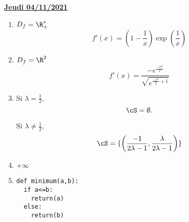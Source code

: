 \documentclass[a4paper, 11pt,reqno]{article}
\newcommand{\jour}[1]{
\begin{center}
\underline{\textbf{#1}}
\end{center}

 }
\begin{document}
\jour{Jeudi 04/11/2021}
\begin{correction}
\begin{enumerate}
\item $D_f = \R_+^*$
$$f'(x) =\left( 1 -\frac{1}{x}\right)\exp\left(\frac{1}{x}\right)$$
\item $D_f=\R^2$
$$f'(x) =\frac{-e^{\frac{-x^2}{2}}}{\sqrt{e^{\frac{-x^2}{2}+1}}}$$
\item 
Si $\lambda=\frac{1}{2}$, $$\cS = \emptyset.$$

Si $\lambda\neq \frac{1}{2},$
$$\cS =\{\left( \frac{-1}{2\lambda -1},\frac{\lambda}{2\lambda -1}   \right) \}$$



\item $+\infty$
\item 
\begin{lstlisting}
def minimum(a,b):
  if a<=b:
    return(a)
  else:
    return(b)
\end{lstlisting}


\end{enumerate}
\end{correction} 
\end{document}
